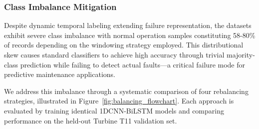\documentclass[12pt]{article}
\begin{document}



\subsubsection{Class Imbalance Mitigation}
\label{subsubsec:class_balancing}

Despite dynamic temporal labeling extending failure representation, the datasets exhibit severe class imbalance with normal operation samples constituting 58-80\% of records depending on the windowing strategy employed. This distributional skew causes standard classifiers to achieve high accuracy through trivial majority-class prediction while failing to detect actual faults—a critical failure mode for predictive maintenance applications.

We address this imbalance through a systematic comparison of four rebalancing strategies, illustrated in Figure~\ref{fig:balancing_flowchart}. Each approach is evaluated by training identical 1DCNN-BiLSTM models and comparing performance on the held-out Turbine T11 validation set.

\end{document}
